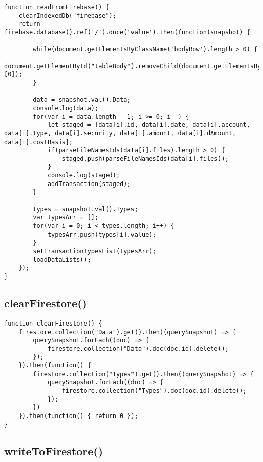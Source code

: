 \documentclass[letterpaper]{article}
\begin{document}
\begin{lstlisting}[firstnumber=32]
function readFromFirebase() {
    clearIndexedDb("firebase");
    return firebase.database().ref('/').once('value').then(function(snapshot) {

        while(document.getElementsByClassName('bodyRow').length > 0) {
            document.getElementById("tableBody").removeChild(document.getElementsByClassName('bodyRow')[0]);
        }

        data = snapshot.val().Data;
        console.log(data);
        for(var i = data.length - 1; i >= 0; i--) {
            let staged = [data[i].id, data[i].date, data[i].account, data[i].type, data[i].security, data[i].amount, data[i].dAmount, data[i].costBasis];
            if(parseFileNamesIds(data[i].files).length > 0) {
                staged.push(parseFileNamesIds(data[i].files));
            }
            console.log(staged);
            addTransaction(staged);
        }

        types = snapshot.val().Types;
        var typesArr = [];
        for(var i = 0; i < types.length; i++) {
            typesArr.push(types[i].value);
        }
        setTransactionTypesList(typesArr);
        loadDataLists();
    });
}
\end{lstlisting}

\subsection{clearFirestore()}

\begin{lstlisting}[firstnumber=61]
function clearFirestore() {
    firestore.collection("Data").get().then((querySnapshot) => {
        querySnapshot.forEach((doc) => {
            firestore.collection("Data").doc(doc.id).delete();
        });
    }).then(function() {
        firestore.collection("Types").get().then((querySnapshot) => {
            querySnapshot.forEach((doc) => {
                firestore.collection("Types").doc(doc.id).delete();
            });
        })
    }).then(function() { return 0 });
}
\end{lstlisting}

\subsection{writeToFirestore()}
\end{document}
